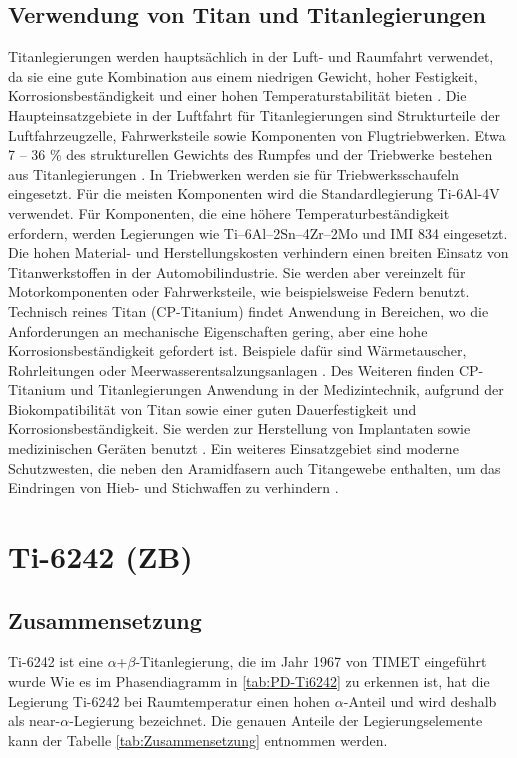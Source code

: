 \subsection{Verwendung von Titan und Titanlegierungen}
Titanlegierungen werden hauptsächlich in der Luft- und Raumfahrt verwendet, da sie eine gute Kombination aus einem niedrigen Gewicht, hoher Festigkeit, Korrosionsbeständigkeit und einer hohen Temperaturstabilität bieten \cite{C.Leyens.2005,R.R.Boyer.1996,M.PetersJ.KumpfertC.WardC.Leyens.2003}. Die Haupteinsatzgebiete in der Luftfahrt für Titanlegierungen sind Strukturteile der Luftfahrzeugzelle, Fahrwerksteile sowie Komponenten von Flugtriebwerken. Etwa 7 -- 36 \% des strukturellen Gewichts des Rumpfes und der Triebwerke bestehen aus Titanlegierungen \cite{Lutjering.2007}. In Triebwerken werden sie für Triebwerksschaufeln eingesetzt. Für die meisten Komponenten wird die Standardlegierung Ti-6Al-4V verwendet. Für Komponenten, die eine höhere Temperaturbeständigkeit erfordern, werden Legierungen wie Ti–6Al–2Sn–4Zr–2Mo und IMI 834 eingesetzt. Die hohen Material- und Herstellungskosten verhindern einen breiten Einsatz von Titanwerkstoffen in der Automobilindustrie. Sie werden aber vereinzelt für Motorkomponenten oder Fahrwerksteile, wie beispielsweise Federn benutzt. Technisch reines Titan (CP-Titanium) findet Anwendung in Bereichen, wo die Anforderungen an mechanische Eigenschaften gering, aber eine hohe Korrosionsbeständigkeit gefordert ist. Beispiele dafür sind Wärmetauscher, Rohrleitungen oder Meerwasserentsalzungsanlagen \cite{A.D.Khawajia.2008}. Des Weiteren finden CP-Titanium und Titanlegierungen Anwendung in der Medizintechnik, aufgrund der Biokompatibilität von Titan sowie einer guten Dauerfestigkeit und Korrosionsbeständigkeit. Sie werden zur Herstellung von Implantaten sowie medizinischen Geräten benutzt \cite{M.GeethaA.K.SinghR.AsokamaniA.K.Gogia.2009}. Ein weiteres Einsatzgebiet sind moderne Schutzwesten, die neben den Aramidfasern auch Titangewebe enthalten, um das Eindringen von Hieb- und Stichwaffen zu verhindern \cite{C.Leyens.2005}.  

\section{Ti-6242 (ZB)}

\subsection{Zusammensetzung}

Ti-6242 ist eine $\alpha$+$\beta$-Titanlegierung, die im Jahr 1967 von TIMET eingeführt wurde %
Wie es im Phasendiagramm in \ref{tab:PD-Ti6242} zu erkennen ist, hat die Legierung Ti-6242 bei Raumtemperatur einen hohen $\alpha$-Anteil und wird deshalb als near-$\alpha$-Legierung bezeichnet.
Die genauen Anteile der Legierungselemente kann der Tabelle \ref{tab:Zusammensetzung} entnommen werden. 


